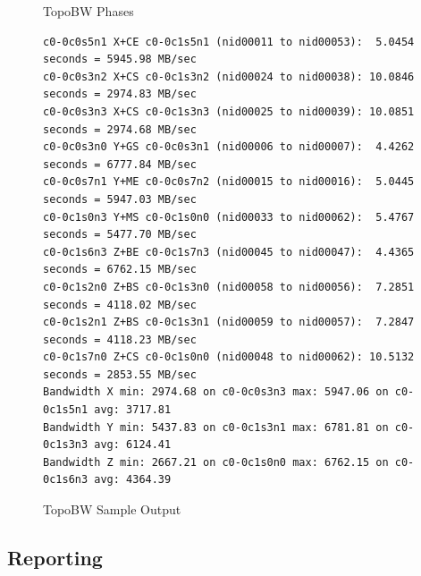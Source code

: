 \documentclass[10pt, conference, compsocconf]{IEEEtran}
\begin{document}
\begin{figure}[h]
  \caption{TopoBW Phases}\label{fig:phases}
\end{figure}

\begin{figure}[ht]
  \begin{verbatim}
c0-0c0s5n1 X+CE c0-0c1s5n1 (nid00011 to nid00053):  5.0454 seconds = 5945.98 MB/sec
c0-0c0s3n2 X+CS c0-0c1s3n2 (nid00024 to nid00038): 10.0846 seconds = 2974.83 MB/sec
c0-0c0s3n3 X+CS c0-0c1s3n3 (nid00025 to nid00039): 10.0851 seconds = 2974.68 MB/sec
c0-0c0s3n0 Y+GS c0-0c0s3n1 (nid00006 to nid00007):  4.4262 seconds = 6777.84 MB/sec
c0-0c0s7n1 Y+ME c0-0c0s7n2 (nid00015 to nid00016):  5.0445 seconds = 5947.03 MB/sec
c0-0c1s0n3 Y+MS c0-0c1s0n0 (nid00033 to nid00062):  5.4767 seconds = 5477.70 MB/sec
c0-0c1s6n3 Z+BE c0-0c1s7n3 (nid00045 to nid00047):  4.4365 seconds = 6762.15 MB/sec
c0-0c1s2n0 Z+BS c0-0c1s3n0 (nid00058 to nid00056):  7.2851 seconds = 4118.02 MB/sec
c0-0c1s2n1 Z+BS c0-0c1s3n1 (nid00059 to nid00057):  7.2847 seconds = 4118.23 MB/sec
c0-0c1s7n0 Z+CS c0-0c1s0n0 (nid00048 to nid00062): 10.5132 seconds = 2853.55 MB/sec
Bandwidth X min: 2974.68 on c0-0c0s3n3 max: 5947.06 on c0-0c1s5n1 avg: 3717.81
Bandwidth Y min: 5437.83 on c0-0c1s3n1 max: 6781.81 on c0-0c1s3n3 avg: 6124.41
Bandwidth Z min: 2667.21 on c0-0c1s0n0 max: 6762.15 on c0-0c1s6n3 avg: 4364.39
  \end{verbatim}
  \caption{TopoBW Sample Output}\label{fig:topobwresults}
\end{figure}

\subsection{Reporting}
\end{document}
